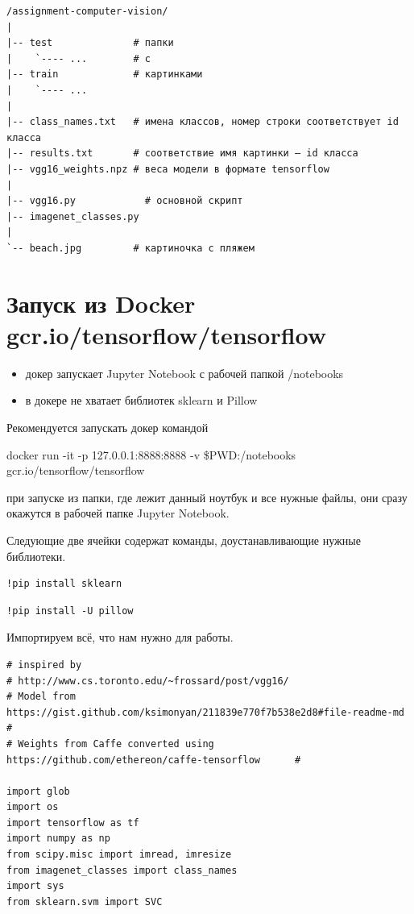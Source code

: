 \documentclass[11pt,a4paper]{article}
\begin{document}
\begin{verbatim}
/assignment-computer-vision/
|
|-- test              # папки  
|    `---- ...        # с
|-- train             # картинками
|    `---- ...
|
|-- class_names.txt   # имена классов, номер строки соответствует id класса
|-- results.txt       # соответствие имя картинки — id класса
|-- vgg16_weights.npz # веса модели в формате tensorflow
|
|-- vgg16.py            # основной скрипт
|-- imagenet_classes.py 
|
`-- beach.jpg         # картиночка с пляжем
\end{verbatim}

\section{Запуск из Docker gcr.io/tensorflow/tensorflow}

\begin{itemize}
\item докер запускает Jupyter Notebook с рабочей папкой /notebooks
\item в докере не хватает библиотек sklearn и Pillow
\end{itemize}

Рекомендуется запускать докер командой

docker run -it -p 127.0.0.1:8888:8888 -v \$PWD:/notebooks gcr.io/tensorflow/tensorflow

при запуске из папки, где лежит данный ноутбук и все нужные файлы, они сразу окажутся в рабочей папке Jupyter Notebook.

Следующие две ячейки содержат команды, доустанавливающие нужные библиотеки.

\begin{verbatim}
!pip install sklearn
\end{verbatim}

\begin{verbatim}
!pip install -U pillow
\end{verbatim}

Импортируем всё, что нам нужно для работы.

\begin{verbatim}
# inspired by
# http://www.cs.toronto.edu/~frossard/post/vgg16/                               
# Model from https://gist.github.com/ksimonyan/211839e770f7b538e2d8#file-readme-md     #
# Weights from Caffe converted using https://github.com/ethereon/caffe-tensorflow      #

import glob
import os
import tensorflow as tf
import numpy as np
from scipy.misc import imread, imresize
from imagenet_classes import class_names
import sys
from sklearn.svm import SVC
\end{verbatim}
\end{document}
